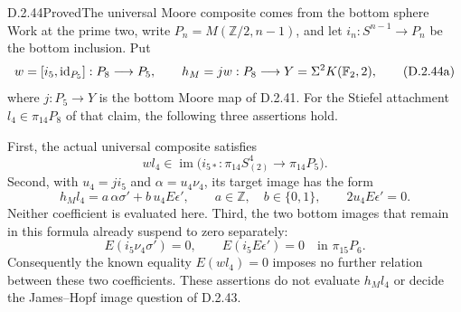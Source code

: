 \begin{claim}{D.2.44}{Proved}{The universal Moore composite comes from the bottom sphere}
Work at the prime two, write $P_n=M(\mathbb Z/2,n-1)$, and
let $i_n:S^{n-1}\to P_n$ be the bottom inclusion.  Put
\[
 w=[i_5,\operatorname{id}_{P_5}]:P_8\longrightarrow P_5,
 \qquad h_M=jw:P_8\longrightarrow Y=\Sigma^2K(\mathbb F_2,2),
 \tag{D.2.44a}
\]
where $j:P_5\to Y$ is the bottom Moore map of D.2.41.
For the Stiefel attachment $l_4\in\pi_{14}P_8$ of that
claim, the following three assertions hold.

First, the actual universal composite satisfies
\[
 wl_4\in\operatorname{im}\bigl(
    i_{5*}:\pi_{14}S^4_{(2)}\longrightarrow\pi_{14}P_5\bigr).
 \tag{D.2.44b}
\]
Second, with $u_4=ji_5$ and $\alpha=u_4\nu_4$, its target
image has the form
\[
 h_Ml_4=a\,\alpha\sigma'+b\,u_4E\epsilon',
 \qquad a\in\mathbb Z,\quad b\in\{0,1\},
 \qquad 2u_4E\epsilon'=0.
 \tag{D.2.44c}
\]
Neither coefficient is evaluated here.  Third, the two bottom
images that remain in this formula already suspend to zero
separately:
\[
 E(i_5\nu_4\sigma')=0,
 \qquad E(i_5E\epsilon')=0
                 \quad\text{in }\pi_{15}P_6.
 \tag{D.2.44d}
\]
Consequently the known equality $E(wl_4)=0$ imposes no further
relation between these two coefficients.  These assertions do
not evaluate $h_Ml_4$ or decide the James--Hopf image question
of D.2.43.
\end{claim}
